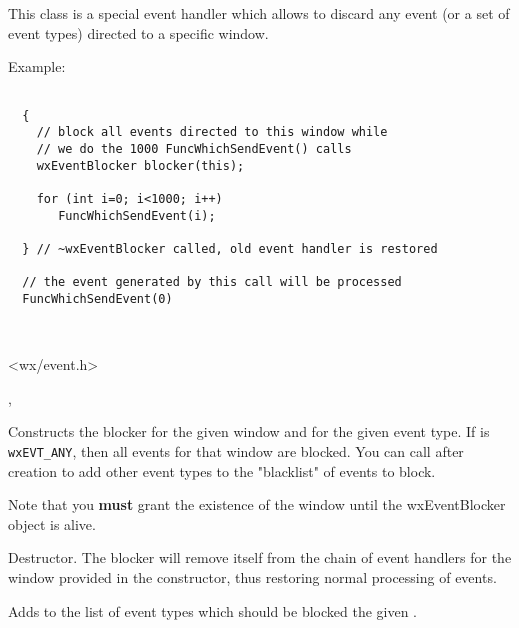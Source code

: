 \section{}\label{wxeventblocker}

This class is a special event handler which allows to discard
any event (or a set of event types) directed to a specific window.

Example:

\begin{verbatim}

  {
    // block all events directed to this window while
    // we do the 1000 FuncWhichSendEvent() calls
    wxEventBlocker blocker(this);
    
    for (int i=0; i<1000; i++)
       FuncWhichSendEvent(i);
       
  } // ~wxEventBlocker called, old event handler is restored

  // the event generated by this call will be processed
  FuncWhichSendEvent(0)
\end{verbatim}



\\


<wx/event.h>


,



\label{wxeventblockerctor}


Constructs the blocker for the given window and for the given event type.
If  is {\tt wxEVT\_ANY}, then all events for that window are blocked.
You can call  after creation to add other event types
to the "blacklist" of events to block.

Note that you {\bf must} grant the existence of the  window until the wxEventBlocker
object is alive.


\label{wxeventblockerdtor}


Destructor. The blocker will remove itself from the chain of event handlers for the window
provided in the constructor, thus restoring normal processing of events.


\label{wxeventblockerblock}


Adds to the list of event types which should be blocked the given .

 	  	 
